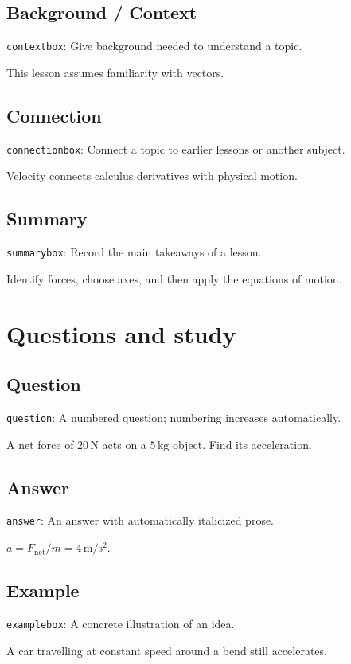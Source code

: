 \documentclass[11pt]{article}
\begin{document}
\subsection{Background / Context}
{\small\texttt{contextbox}: Give background needed to understand a topic.}
\begin{contextbox}
This lesson assumes familiarity with vectors.
\end{contextbox}
\subsection{Connection}
{\small\texttt{connectionbox}: Connect a topic to earlier lessons or another subject.}
\begin{connectionbox}
Velocity connects calculus derivatives with physical motion.
\end{connectionbox}
\subsection{Summary}
{\small\texttt{summarybox}: Record the main takeaways of a lesson.}
\begin{summarybox}
Identify forces, choose axes, and then apply the equations of motion.
\end{summarybox}

\clearpage
\section{Questions and study}
\subsection{Question}
{\small\texttt{question}: A numbered question; numbering increases automatically.}
\begin{question}
A net force of $20\,\mathrm{N}$ acts on a $5\,\mathrm{kg}$ object. Find its acceleration.
\end{question}
\subsection{Answer}
{\small\texttt{answer}: An answer with automatically italicized prose.}
\begin{answer}
$a=F_{\mathrm{net}}/m=4\,\mathrm{m/s^2}$.
\end{answer}
\subsection{Example}
{\small\texttt{examplebox}: A concrete illustration of an idea.}
\begin{examplebox}
A car travelling at constant speed around a bend still accelerates.
\end{examplebox}
\end{document}
